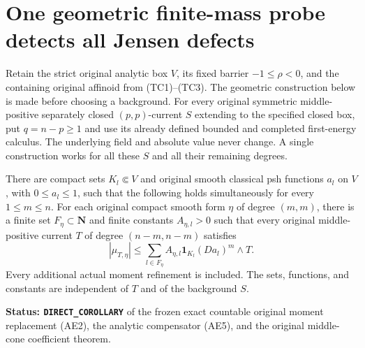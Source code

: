 \section{One geometric finite-mass probe detects all Jensen defects}
\label{sec:r12-universal-jensen-probe}

Retain the strict original analytic box $V$, its fixed barrier
$-1\leq\rho<0$, and the containing original affinoid from
(TC1)--(TC3).  The geometric construction below is made before
choosing a background.  For every original symmetric middle-positive
separately closed $(p,p)$-current $S$ extending to the specified
closed box, put $q=n-p\geq1$ and use its already defined bounded
and completed first-energy calculus.  The underlying field and
absolute value never change.  A single construction works for
all these $S$ and all their remaining degrees.

\begin{lemma}
\label{lem:r12-countable-geometric-compensators}
There are compact sets $K_l\Subset V$ and original smooth classical
psh functions $a_l$ on $V$, with $0\leq a_l\leq1$, such that the
following holds simultaneously for every $1\leq m\leq n$.
For each original compact smooth form $\eta$ of degree $(m,m)$,
there is a finite set $F_\eta\subset\mathbf N$ and finite constants
$A_{\eta,l}>0$ such that every original middle-positive current
$T$ of degree $(n-m,n-m)$ satisfies
\[
       |\mu_{T,\eta}|
         \leq\sum_{l\in F_\eta}A_{\eta,l}\mathbf1_{K_l}
                                      (Da_l)^m\wedge T.
 \tag{UP1}
\]
Every additional actual moment refinement is included.  The sets,
functions, and constants are independent of $T$ and of the
background $S$.
\end{lemma}

\noindent\textbf{Status: \texttt{DIRECT\_COROLLARY}} of the frozen
exact countable original moment replacement (AE2), the analytic
compensator (AE5), and the original middle-cone coefficient theorem.

